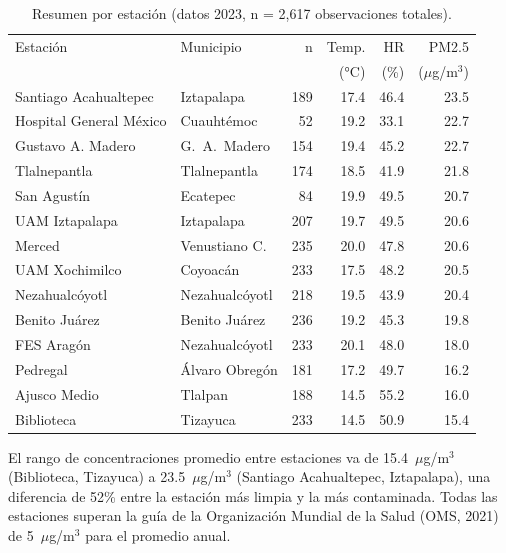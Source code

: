 \documentclass[12pt]{article}
\begin{document}
\begin{table}[H]
\centering
\caption{Resumen por estaci\'on (datos 2023, n = 2{,}617 observaciones totales).}
\label{tab:estaciones}
\small
\begin{tabular}{>{\raggedright\arraybackslash}p{4.5cm}
                >{\raggedright\arraybackslash}p{2.8cm}rrrr}
\toprule
Estaci\'on & Municipio & n & Temp. & HR & PM2.5 \\
           &           &   & (°C) & (\%) & ($\mu$g/m$^3$) \\
\midrule
Santiago Acahualtepec & Iztapalapa       & 189 & 17.4 & 46.4 & 23.5 \\
Hospital General M\'exico & Cuauht\'emoc & 52  & 19.2 & 33.1 & 22.7 \\
Gustavo A. Madero      & G.~A.~Madero    & 154 & 19.4 & 45.2 & 22.7 \\
Tlalnepantla           & Tlalnepantla    & 174 & 18.5 & 41.9 & 21.8 \\
San Agust\'in          & Ecatepec        & 84  & 19.9 & 49.5 & 20.7 \\
UAM Iztapalapa         & Iztapalapa      & 207 & 19.7 & 49.5 & 20.6 \\
Merced                 & Venustiano C.   & 235 & 20.0 & 47.8 & 20.6 \\
UAM Xochimilco         & Coyoac\'an      & 233 & 17.5 & 48.2 & 20.5 \\
Nezahualc\'oyotl       & Nezahualc\'oyotl& 218 & 19.5 & 43.9 & 20.4 \\
Benito Ju\'arez        & Benito Ju\'arez & 236 & 19.2 & 45.3 & 19.8 \\
FES Arag\'on           & Nezahualc\'oyotl& 233 & 20.1 & 48.0 & 18.0 \\
Pedregal               & \'Alvaro Obreg\'on& 181& 17.2 & 49.7 & 16.2 \\
Ajusco Medio           & Tlalpan         & 188 & 14.5 & 55.2 & 16.0 \\
Biblioteca             & Tizayuca        & 233 & 14.5 & 50.9 & 15.4 \\
\bottomrule
\end{tabular}
\normalsize
\end{table}

El rango de concentraciones promedio entre estaciones va de
15.4~$\mu$g/m$^3$ (Biblioteca, Tizayuca) a
23.5~$\mu$g/m$^3$ (Santiago Acahualtepec, Iztapalapa),
una diferencia de 52\% entre la estaci\'on m\'as limpia y la m\'as
contaminada.
Todas las estaciones superan la gu\'ia de la Organizaci\'on Mundial
de la Salud (OMS, 2021) de 5~$\mu$g/m$^3$ para el promedio anual.
\end{document}
